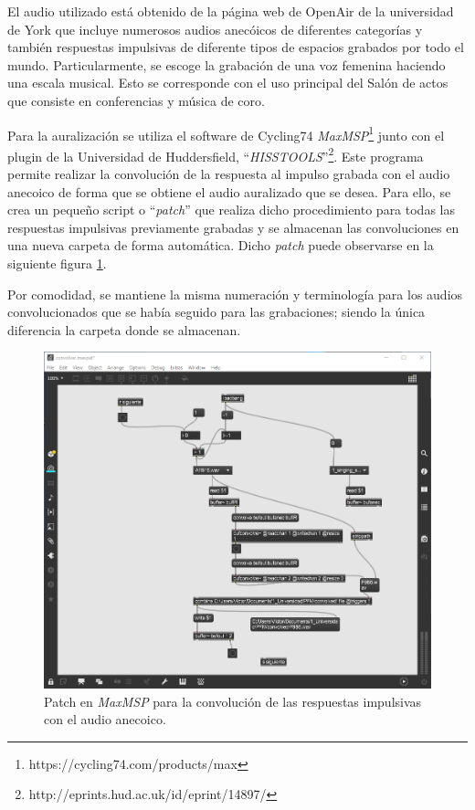 \documentclass[11pt,a4paper]{book}
\begin{document}
                El audio utilizado está obtenido de la página web de OpenAir de la universidad de York que incluye numerosos audios anecóicos de diferentes categorías y también respuestas impulsivas de diferente tipos de espacios grabados por todo el mundo. Particularmente, se escoge la grabación de una voz femenina haciendo una escala musical. Esto se corresponde con el uso principal del Salón de actos que consiste en conferencias y música de coro.
        
                Para la auralización se utiliza el software de Cycling74 \textit{MaxMSP}\footnote{https://cycling74.com/products/max} junto con el plugin de la Universidad de Huddersfield, ``\textit{HISSTOOLS}''\footnote{http://eprints.hud.ac.uk/id/eprint/14897/}. Este programa permite realizar la convolución de la respuesta al impulso grabada con el audio anecoico de forma que se obtiene el audio auralizado que se desea. Para ello, se crea un pequeño script o ``\textit{patch}'' que realiza dicho procedimiento para todas las respuestas impulsivas previamente grabadas y se almacenan las convoluciones en una nueva carpeta de forma automática. Dicho \textit{patch} puede observarse en la siguiente figura \ref{fig:convolver_max}.
                
                Por comodidad, se mantiene la misma numeración y terminología para los audios convolucionados que se había seguido para las grabaciones; siendo la única diferencia la carpeta donde se almacenan.
        
                \begin{figure}[H]
	                \includegraphics[scale=0.4]{../imagenes/convolver_max.png}
			        \centering
			        \caption{Patch en \textit{MaxMSP} para la convolución de las respuestas impulsivas con el audio anecoico.}
			        \label{fig:convolver_max}
	            \end{figure}
        
\end{document}
